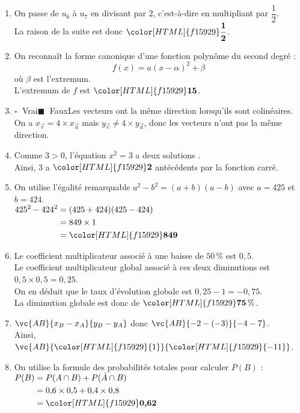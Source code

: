 \documentclass[a4paper,11pt,landscape,exos]{nsi} %
\begin{document}
\begin{multicols}{2}
\begin{enumerate}[itemsep=1em]
\item On passe de $u_{6}$ à $u_{7}$ en divisant par $2$, c'est-à-dire en multipliant par $\dfrac{1}{2}$.\\
    La raison de la suite est donc ${\color[HTML]{f15929}\boldsymbol{\dfrac{1}{2}}}$.
\item On reconnaît la forme canonique d'une fonction polynôme du second degré :\[f(x)=a(x-\alpha)^2+\beta\] où $\beta$ est l'extremum.\\
    L'extremum de $f$ est ${\color[HTML]{f15929}\boldsymbol{15}}$.
\item  
    
    	$\square\;$ Vrai\qquad $\blacksquare\;$ Faux\qquad Les vecteurs ont la même direction lorsqu'ils sont colinéaires.\\
    On a $x_{\vec{v}}=4\times x_{\vec{u}}$ mais $y_{\vec{v}}\neq 4\times y_{\vec{u}}$, donc les vecteurs n'ont pas la même direction.
\item Comme $3 > 0$, l'équation $x^2=3$   a deux solutions . \\
    Ainsi, $3$ a ${\color[HTML]{f15929}\boldsymbol{2}}$ antécédents par la fonction carré.
\item On utilise l'égalité remarquable $a^2-b^2=(a+b)(a-b)$ avec $a=425$ et $b=424$.\\
    $\begin{aligned}
    425^2-424^2&=(425+424)(425-424)\\
    &=849\times 1\\
    &={\color[HTML]{f15929}\boldsymbol{849}}
    \end{aligned}$
\item  Le coefficient multiplicateur  associé à une baisse de $50\,\%$ est $0{,}5$.\\
    Le coefficient multiplicateur global associé à ces deux diminutions est $0{,}5\times 0{,}5= 0{,}25$.\\
    On en déduit que le taux d'évolution globale est $0{,}25-1=-0{,}75$.\\
    La diminution globale est donc de ${\color[HTML]{f15929}\boldsymbol{75}} \,\%$.
\item $\vc{AB}{x_B-x_A}{y_B-y_A}$ donc $\vc{AB}{-2-(-3)}{-4-7}$.\\
         Ainsi, $\vc{AB}{\color[HTML]{f15929}{1}}{\color[HTML]{f15929}{-11}}$.
\item On utilise la formule des probabilités totales pour calculer $P(B)$ :\\
              $\begin{aligned}
              P(B)&=P(A\cap B)+P(\bar{A}\cap B)\\
              &=0{,}6\times 0{,}5+0{,}4\times 0{,}8\\
    &={\color[HTML]{f15929}\boldsymbol{0{,}62}}
              \end{aligned}$
\end{enumerate}
\end{multicols}
\end{document}
